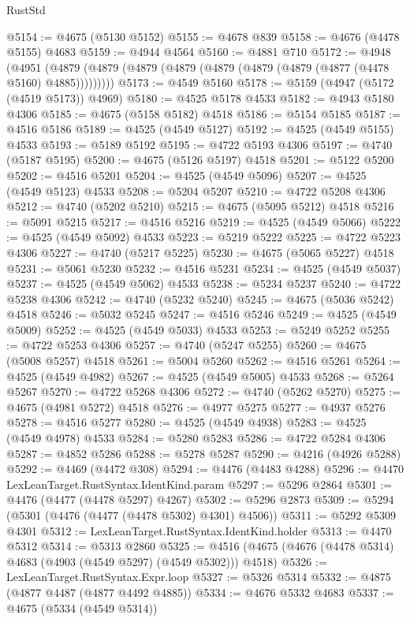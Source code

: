 \begin{lexlean}{RustStd}
\begin{coremodule}
@5154 := @4675 (@5130 @5152)
@5155 := @4678 @839
@5158 := @4676 (@4478 @5155) @4683
@5159 := @4944 @4564
@5160 := @4881 @710
@5172 := @4948
    (@4951 (@4879 (@4879 (@4879 (@4879 (@4879 (@4879 (@4879 (@4877 (@4478 @5160) @4885)))))))))
@5173 := @4549 @5160
@5178 := @5159 (@4947 (@5172 (@4519 @5173)) @4969)
@5180 := @4525 @5178 @4533
@5182 := @4943 @5180 @4306
@5185 := @4675 (@5158 @5182) @4518
@5186 := @5154 @5185
@5187 := @4516 @5186
@5189 := @4525 (@4549 @5127)
@5192 := @4525 (@4549 @5155) @4533
@5193 := @5189 @5192
@5195 := @4722 @5193 @4306
@5197 := @4740 (@5187 @5195)
@5200 := @4675 (@5126 @5197) @4518
@5201 := @5122 @5200
@5202 := @4516 @5201
@5204 := @4525 (@4549 @5096)
@5207 := @4525 (@4549 @5123) @4533
@5208 := @5204 @5207
@5210 := @4722 @5208 @4306
@5212 := @4740 (@5202 @5210)
@5215 := @4675 (@5095 @5212) @4518
@5216 := @5091 @5215
@5217 := @4516 @5216
@5219 := @4525 (@4549 @5066)
@5222 := @4525 (@4549 @5092) @4533
@5223 := @5219 @5222
@5225 := @4722 @5223 @4306
@5227 := @4740 (@5217 @5225)
@5230 := @4675 (@5065 @5227) @4518
@5231 := @5061 @5230
@5232 := @4516 @5231
@5234 := @4525 (@4549 @5037)
@5237 := @4525 (@4549 @5062) @4533
@5238 := @5234 @5237
@5240 := @4722 @5238 @4306
@5242 := @4740 (@5232 @5240)
@5245 := @4675 (@5036 @5242) @4518
@5246 := @5032 @5245
@5247 := @4516 @5246
@5249 := @4525 (@4549 @5009)
@5252 := @4525 (@4549 @5033) @4533
@5253 := @5249 @5252
@5255 := @4722 @5253 @4306
@5257 := @4740 (@5247 @5255)
@5260 := @4675 (@5008 @5257) @4518
@5261 := @5004 @5260
@5262 := @4516 @5261
@5264 := @4525 (@4549 @4982)
@5267 := @4525 (@4549 @5005) @4533
@5268 := @5264 @5267
@5270 := @4722 @5268 @4306
@5272 := @4740 (@5262 @5270)
@5275 := @4675 (@4981 @5272) @4518
@5276 := @4977 @5275
@5277 := @4937 @5276
@5278 := @4516 @5277
@5280 := @4525 (@4549 @4938)
@5283 := @4525 (@4549 @4978) @4533
@5284 := @5280 @5283
@5286 := @4722 @5284 @4306
@5287 := @4852 @5286
@5288 := @5278 @5287
@5290 := @4216 (@4926 @5288)
@5292 := @4469 (@4472 @308)
@5294 := @4476 (@4483 @4288)
@5296 := @4470 LexLeanTarget.RustSyntax.IdentKind.param
@5297 := @5296 @2864
@5301 := @4476 (@4477 (@4478 @5297) @4267)
@5302 := @5296 @2873
@5309 := @5294 (@5301 (@4476 (@4477 (@4478 @5302) @4301) @4506))
@5311 := @5292 @5309 @4301
@5312 := LexLeanTarget.RustSyntax.IdentKind.holder
@5313 := @4470 @5312
@5314 := @5313 @2860
@5325 := @4516 (@4675 (@4676 (@4478 @5314) @4683 (@4903 (@4549 @5297) (@4549 @5302))) @4518)
@5326 := LexLeanTarget.RustSyntax.Expr.loop
@5327 := @5326 @5314
@5332 := @4875 (@4877 @4487 (@4877 @4492 @4885))
@5334 := @4676 @5332 @4683
@5337 := @4675 (@5334 (@4549 @5314))

\end{coremodule}
\end{lexlean}
